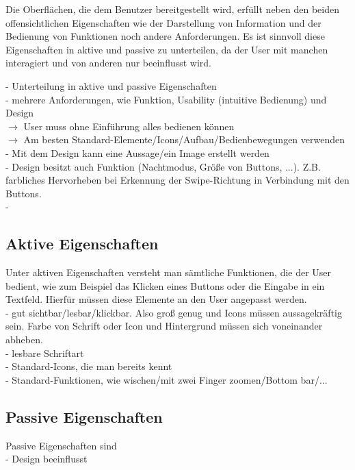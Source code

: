 Die Oberflächen, die dem Benutzer bereitgestellt wird, erfüllt neben den beiden offensichtlichen Eigenschaften wie der Darstellung von Information und der Bedienung von Funktionen noch andere Anforderungen. Es ist sinnvoll diese Eigenschaften in aktive und passive zu unterteilen, da der User mit manchen interagiert und von anderen nur beeinflusst wird.


\noindent - Unterteilung in aktive und passive Eigenschaften \\
- mehrere Anforderungen, wie Funktion, Usability (intuitive Bedienung) und Design \\
$\rightarrow$ User muss ohne Einführung alles bedienen können\\
$\rightarrow$ Am besten Standard-Elemente/Icons/Aufbau/Bedienbewegungen verwenden\\
- Mit dem Design kann eine Aussage/ein Image erstellt werden \\
- Design besitzt auch Funktion (Nachtmodus, Größe von Buttons, ...). Z.B. farbliches Hervorheben bei Erkennung der Swipe-Richtung in Verbindung mit den Buttons.\\
- 

\subsection{Aktive Eigenschaften}
Unter aktiven Eigenschaften versteht man sämtliche Funktionen, die der User bedient, wie zum Beispiel das Klicken eines Buttons oder die Eingabe in ein Textfeld. Hierfür müssen diese Elemente an den User angepasst werden. \\
- gut sichtbar/lesbar/klickbar. Also groß genug und Icons müssen aussagekräftig sein. Farbe von Schrift oder Icon und Hintergrund müssen sich voneinander abheben. \\
- lesbare Schriftart\\
- Standard-Icons, die man bereits kennt\\
- Standard-Funktionen, wie wischen/mit zwei Finger zoomen/Bottom bar/...

\subsection{Passive Eigenschaften}
Passive Eigenschaften sind \\

- Design beeinflusst 